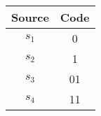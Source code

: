 \documentclass{subfiles}
\begin{document}
    \begin{table*}[!hb]
        \centering
        \begin{tabular}{|c|c|}
            \hline
            \textbf{Source} & \textbf{Code} \\ 
            \hline
            \(s_{1}\) & 0 \\
            \(s_{2}\) & 1 \\
            \(s_{3}\) & 01 \\
            \(s_{4}\) & 11 \\
            \hline
        \end{tabular}
    \end{table*}
\end{document}
